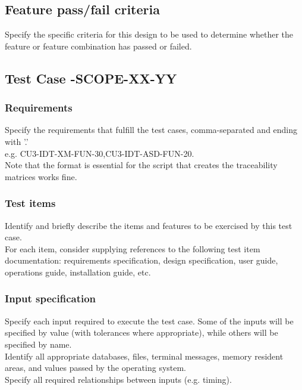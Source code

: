 \documentclass[DM,lsstdraft,STS,toc]{lsstdoc}
\begin{document}
\subsection{Feature pass/fail criteria}
Specify the specific criteria for this design to be used to determine whether the feature or feature combination has passed or failed.





\subsection{Test Case \product-SCOPE-XX-YY}

\subsubsection{Requirements}
Specify the requirements that fulfill the test cases, comma-separated and ending with '.'\\
e.g. CU3-IDT-XM-FUN-30,CU3-IDT-ASD-FUN-20.\\
Note that the format is essential for the script that creates the traceability matrices works fine.

\subsubsection{Test items}
Identify and briefly describe the items and features to be exercised by this test case.\\
For each item, consider supplying references to the following test item documentation: requirements specification, design
specification, user guide, operations guide, installation guide, etc.

\subsubsection{Input specification \label{sect:tcinput}}
Specify each input required to execute the test case. Some of the inputs will be specified by value (with tolerances where
appropriate), while others will be specified by name.\\
Identify all appropriate databases, files, terminal messages, memory resident areas, and values passed by the operating system.\\
Specify all required relationships between inputs (e.g. timing).
\end{document}
